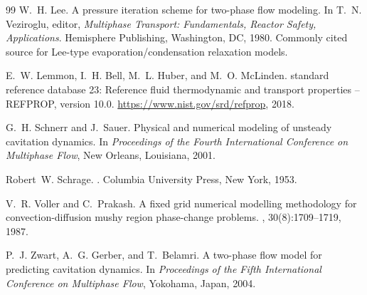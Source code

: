 \documentclass[UTF8,fontset=none]{ctexart}
\begin{document}
\begin{thebibliography}{99}
W.~H. Lee.
\newblock A pressure iteration scheme for two-phase flow modeling.
\newblock In T.~N. Veziroglu, editor, {\em Multiphase Transport: Fundamentals,
  Reactor Safety, Applications}. Hemisphere Publishing, Washington, DC, 1980.
\newblock Commonly cited source for Lee-type evaporation/condensation
  relaxation models.

E.~W. Lemmon, I.~H. Bell, M.~L. Huber, and M.~O. McLinden.
 standard reference database 23: Reference fluid thermodynamic
  and transport properties -- {REFPROP}, version 10.0.
\newblock \url{https://www.nist.gov/srd/refprop}, 2018.

G.~H. Schnerr and J.~Sauer.
\newblock Physical and numerical modeling of unsteady cavitation dynamics.
\newblock In {\em Proceedings of the Fourth International Conference on
  Multiphase Flow}, New Orleans, Louisiana, 2001.

Robert~W. Schrage.
.
\newblock Columbia University Press, New York, 1953.

V.~R. Voller and C.~Prakash.
\newblock A fixed grid numerical modelling methodology for convection-diffusion
  mushy region phase-change problems.
,
  30(8):1709--1719, 1987.

P.~J. Zwart, A.~G. Gerber, and T.~Belamri.
\newblock A two-phase flow model for predicting cavitation dynamics.
\newblock In {\em Proceedings of the Fifth International Conference on
  Multiphase Flow}, Yokohama, Japan, 2004.

\end{thebibliography}
\end{document}
